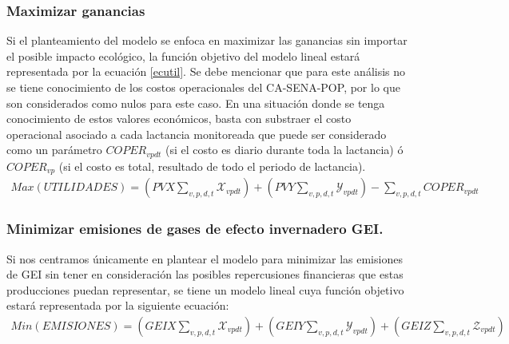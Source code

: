 \subsubsection{Maximizar ganancias}

Si el planteamiento del modelo se enfoca en maximizar las ganancias sin importar el posible impacto ecológico, la función objetivo del modelo lineal estará representada por la ecuación \ref{ecutil}. Se debe mencionar que para este análisis no se tiene conocimiento de los costos operacionales del CA-SENA-POP, por lo que son considerados como nulos para este caso. En una situación donde se tenga conocimiento de estos valores económicos, basta con substraer el costo operacional asociado a cada lactancia monitoreada que puede ser considerado como un parámetro $COPER_{vpdt}$ (si el costo es diario durante toda la lactancia) ó $COPER_{vp}$ (si el costo es total, resultado de todo el periodo de lactancia).
\begin{equation}\label{ecutil}
\begin{split}
    Max(UTILIDADES) =\left(PVX\sum_{v,p,d,t}\mathcal{X}_{vpdt}\right) + \left(PVY\sum_{v,p,d,t}\mathcal{Y}_{vpdt} \right) - \sum_{v,p,d,t}COPER_{vpdt}
\end{split}
\end{equation}

\subsubsection{Minimizar emisiones de gases de efecto invernadero GEI.}

Si nos centramos únicamente en plantear el modelo para minimizar las emisiones de GEI sin tener en consideración las posibles repercusiones financieras que estas producciones puedan representar, se tiene un modelo lineal cuya función objetivo estará representada por la siguiente ecuación:
\begin{equation}\label{ecemis}
\begin{split}
    Min(EMISIONES) =\left( GEIX\sum_{v,p,d,t}\mathcal{X}_{vpdt}\right) + \left(GEIY\sum_{v,p,d,t}\mathcal{Y}_{vpdt}\right) + \left(GEIZ\sum_{v,p,d,t}\mathcal{Z}_{vpdt} \right)
\end{split}
\end{equation}


